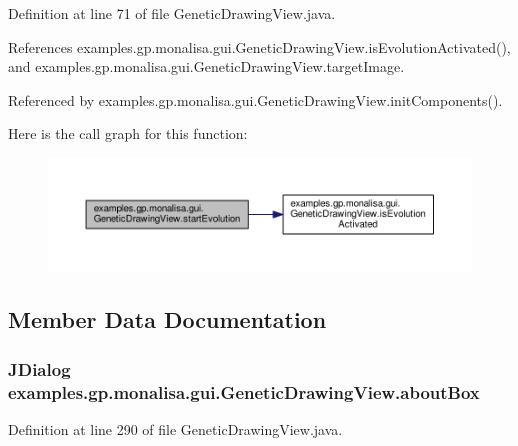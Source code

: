 Definition at line 71 of file Genetic\-Drawing\-View.\-java.



References examples.\-gp.\-monalisa.\-gui.\-Genetic\-Drawing\-View.\-is\-Evolution\-Activated(), and examples.\-gp.\-monalisa.\-gui.\-Genetic\-Drawing\-View.\-target\-Image.



Referenced by examples.\-gp.\-monalisa.\-gui.\-Genetic\-Drawing\-View.\-init\-Components().



Here is the call graph for this function\-:
\nopagebreak
\begin{figure}[H]
\begin{center}
\leavevmode
\includegraphics[width=350pt]{classexamples_1_1gp_1_1monalisa_1_1gui_1_1_genetic_drawing_view_afe709e27b8aceffd724f3cd4b56e0914_cgraph}
\end{center}
\end{figure}




\subsection{Member Data Documentation}
\hypertarget{classexamples_1_1gp_1_1monalisa_1_1gui_1_1_genetic_drawing_view_a4c05c4f2fc677dcca404467750481167}{
\subsubsection[{about\-Box}]{\setlength{\rightskip}{0pt plus 5cm}J\-Dialog examples.\-gp.\-monalisa.\-gui.\-Genetic\-Drawing\-View.\-about\-Box\hspace{0.3cm}{\ttfamily [private]}}}\label{classexamples_1_1gp_1_1monalisa_1_1gui_1_1_genetic_drawing_view_a4c05c4f2fc677dcca404467750481167}


Definition at line 290 of file Genetic\-Drawing\-View.\-java.



